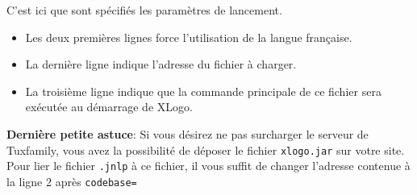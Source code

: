 C'est ici que sont spécifiés les paramètres de lancement. 
\begin{itemize}
 \item Les deux premières lignes force l'utilisation de la langue française.
\item La dernière ligne indique l'adresse du fichier à charger.
\item La troisième ligne indique que la commande principale de ce fichier sera exécutée au démarrage de XLogo.
\end{itemize}
\vspace{0.5cm}
\textbf{Dernière petite astuce}: Si vous désirez ne pas surcharger le serveur de Tuxfamily, vous avez la possibilité de déposer le fichier \texttt{xlogo.jar} sur votre site. Pour lier le fichier \texttt{.jnlp} à ce fichier, il vous suffit de changer l'adresse contenue à la ligne 2 après \texttt{codebase=}
